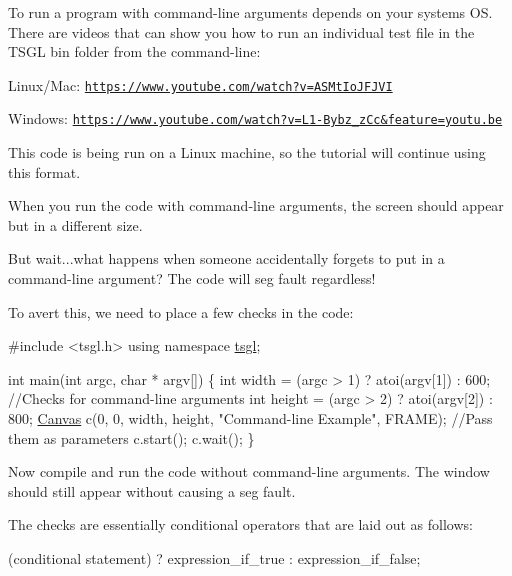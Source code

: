 To run a program with command-\/line arguments depends on your system\textquotesingle{}s O\+S. There are videos that can show you how to run an individual test file in the T\+S\+G\+L bin folder from the command-\/line\+:


\begin{DoxyItemize}
\item Linux/\+Mac\+: \href{https://www.youtube.com/watch?v=ASMtIoJFJVI}{\tt https\+://www.\+youtube.\+com/watch?v=\+A\+S\+Mt\+Io\+J\+F\+J\+V\+I}
\item Windows\+: \href{https://www.youtube.com/watch?v=L1-Bybz_zCc&feature=youtu.be}{\tt https\+://www.\+youtube.\+com/watch?v=\+L1-\/\+Bybz\+\_\+z\+Cc\&feature=youtu.\+be}
\end{DoxyItemize}

This code is being run on a Linux machine, so the tutorial will continue using this format.

When you run the code with command-\/line arguments, the screen should appear but in a different size.

But wait...what happens when someone accidentally forgets to put in a command-\/line argument? The code will seg fault regardless!

To avert this, we need to place a few checks in the code\+:


\begin{DoxyCode}
\textcolor{preprocessor}{#include <tsgl.h>}
\textcolor{keyword}{using namespace }\hyperlink{namespacetsgl}{tsgl};

\textcolor{keywordtype}{int} main(\textcolor{keywordtype}{int} argc, \textcolor{keywordtype}{char} * argv[]) \{
  \textcolor{keywordtype}{int} width = (argc > 1) ? atoi(argv[1]) : 600; \textcolor{comment}{//Checks for command-line arguments}
  \textcolor{keywordtype}{int} height = (argc > 2) ? atoi(argv[2]) : 800;
  \hyperlink{classtsgl_1_1_canvas}{Canvas} c(0, 0, width, height, \textcolor{stringliteral}{"Command-line Example"}, FRAME);  \textcolor{comment}{//Pass them as parameters}
  c.start();
  c.wait();
\}
\end{DoxyCode}


Now compile and run the code without command-\/line arguments. The window should still appear without causing a seg fault.

The checks are essentially conditional operators that are laid out as follows\+:

(conditional statement) ? expression\+\_\+if\+\_\+true \+: expression\+\_\+if\+\_\+false;

